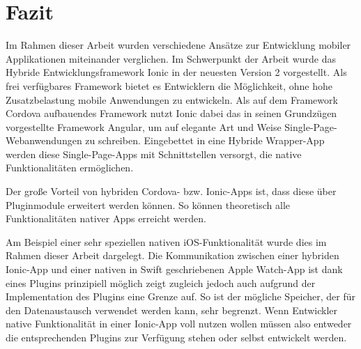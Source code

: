\chapter{Fazit}
%
Im Rahmen dieser Arbeit wurden verschiedene Ansätze zur Entwicklung mobiler Applikationen miteinander verglichen. Im Schwerpunkt der Arbeit wurde das Hybride Entwicklungsframework Ionic in der neuesten Version 2 vorgestellt. Als frei verfügbares Framework bietet es Entwicklern die Möglichkeit, ohne hohe Zusatzbelastung mobile Anwendungen zu entwickeln. Als auf dem Framework Cordova aufbauendes Framework nutzt Ionic dabei das in seinen Grundzügen vorgestellte Framework Angular, um auf elegante Art und Weise Single-Page-Webanwendungen zu schreiben. Eingebettet in eine Hybride Wrapper-App werden diese Single-Page-Apps mit Schnittstellen versorgt, die native Funktionalitäten ermöglichen. 

Der große Vorteil von hybriden Cordova- bzw. Ionic-Apps ist, dass diese über Pluginmodule erweitert werden können. So können theoretisch alle Funktionalitäten nativer Apps erreicht werden.

Am Beispiel einer sehr speziellen nativen iOS-Funktionalität wurde dies im Rahmen dieser Arbeit dargelegt. Die Kommunikation zwischen einer hybriden Ionic-App und einer nativen in Swift geschriebenen Apple Watch-App ist dank eines Plugins prinzipiell möglich zeigt zugleich jedoch auch aufgrund der Implementation des Plugins eine Grenze auf. So ist der mögliche Speicher, der für den Datenaustausch verwendet werden kann, sehr begrenzt. Wenn Entwickler native Funktionalität in einer Ionic-App voll nutzen wollen müssen also entweder die entsprechenden Plugins zur Verfügung stehen oder selbst entwickelt werden.